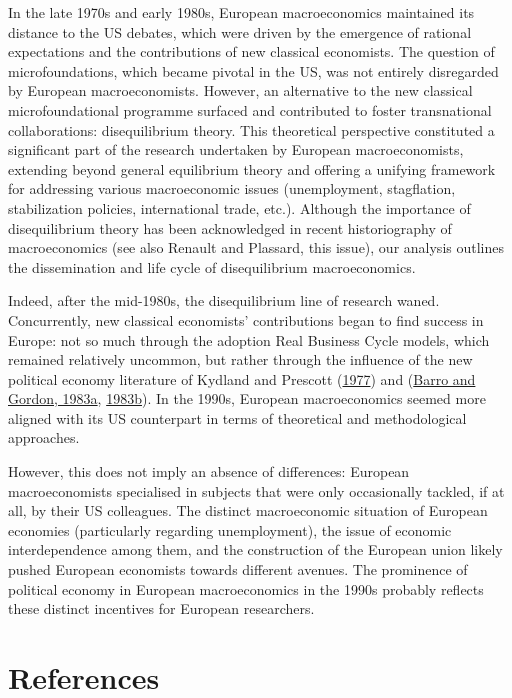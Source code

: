 \documentclass[
  12pt,
  onecolumn]{article}
\begin{document}
In the late 1970s and early 1980s, European macroeconomics maintained its distance to the US debates, which were driven by the emergence of rational expectations and the contributions of new classical economists. The question of microfoundations, which became pivotal in the US, was not entirely disregarded by European macroeconomists. However, an alternative to the new classical microfoundational programme surfaced and contributed to foster transnational collaborations: disequilibrium theory. This theoretical perspective constituted a significant part of the research undertaken by European macroeconomists, extending beyond general equilibrium theory and offering a unifying framework for addressing various macroeconomic issues (unemployment, stagflation, stabilization policies, international trade, etc.). Although the importance of disequilibrium theory has been acknowledged in recent historiography of macroeconomics (see also Renault and Plassard, this issue), our analysis outlines the dissemination and life cycle of disequilibrium macroeconomics.

Indeed, after the mid-1980s, the disequilibrium line of research waned. Concurrently, new classical economists' contributions began to find success in Europe: not so much through the adoption Real Business Cycle models, which remained relatively uncommon, but rather through the influence of the new political economy literature of Kydland and Prescott (\protect\hyperlink{ref-kydland1977}{1977}) and (\protect\hyperlink{ref-barro1983}{Barro and Gordon, 1983a}, \protect\hyperlink{ref-barro1983c}{1983b}). In the 1990s, European macroeconomics seemed more aligned with its US counterpart in terms of theoretical and methodological approaches.

However, this does not imply an absence of differences: European macroeconomists specialised in subjects that were only occasionally tackled, if at all, by their US colleagues. The distinct macroeconomic situation of European economies (particularly regarding unemployment), the issue of economic interdependence among them, and the construction of the European union likely pushed European economists towards different avenues. The prominence of political economy in European macroeconomics in the 1990s probably reflects these distinct incentives for European researchers.

\newpage

\hypertarget{references}{%
\section*{References}\label{references}}
\end{document}
